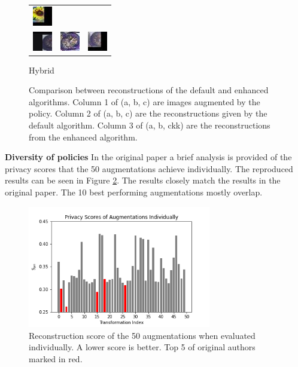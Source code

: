 \begin{figure}[h]
\begin{subtable}{.33\linewidth}
{\begin{tabular}{ l l l }
             \includegraphics[width = 24pt]{enhimagesHybrid/rec_77.jpg} \\
             \includegraphics[width = 24pt]{enhimagesHybrid/ori_91.jpg} & \includegraphics[width = 24pt]{defimagesHybrid/rec_91.jpg} &
             \includegraphics[width = 24pt]{enhimagesHybrid/rec_91.jpg} \\
        \end{tabular}}
        \caption{Hybrid}%
    \end{subtable}%
    \endgroup
    \caption{Comparison between reconstructions of the default and enhanced algorithms. Column 1 of (a, b, c) are images augmented by the policy. Column 2 of (a, b, c) are the reconstructions given by the default algorithm. Column 3 of (a, b, ckk) are the reconstructions from the enhanced algorithm. }
    \label{fig:attack}
\end{figure}

\textbf{Diversity of policies}
In the original paper a brief analysis is provided of the privacy scores that the 50 augmentations achieve individually. The reproduced results can be seen in Figure \ref{fig:individual}. The results closely match the results in the original paper. The 10 best performing augmentations mostly overlap.

\begin{figure}[htp]
    \centering
    \includegraphics[width=8cm]{pics/policy_reconstruction_individual_fixed.png}
    \caption{Reconstruction score of the 50 augmentations when evaluated individually. A lower score is better. Top 5 of original authors marked in red.}
    \label{fig:individual}
\end{figure}

